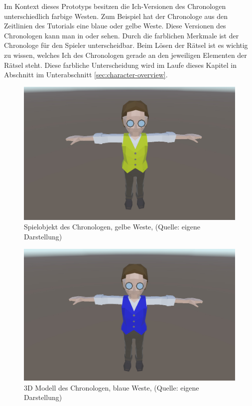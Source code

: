 Im Kontext dieses Prototyps besitzen die Ich-Versionen des Chronologen unterschiedlich farbige Westen. Zum Beispiel hat der Chronologe aus den Zeitlinien des Tutorials eine blaue oder gelbe Weste. Diese Versionen des Chronologen kann man in  oder  sehen. Durch die farblichen Merkmale ist der Chronologe für den Spieler unterscheidbar. Beim Lösen der Rätsel ist es wichtig zu wissen, welches Ich des Chronologen gerade an den jeweiligen Elementen der Rätsel steht. Diese farbliche Unterscheidung wird im Laufe dieses Kapitel in Abschnitt  im Unterabschnitt \ref{sec:character-overview}.

\begin{figure}[ht]
\centering
\includegraphics[width=0.8\linewidth]{content/pictures/Chronologe_y.jpg}
\caption{Spielobjekt des Chronologen, gelbe Weste, (Quelle: eigene Darstellung)}
\label{fig:chronologe_y}
\end{figure}

\begin{figure}[ht]
\centering
\includegraphics[width=0.8\linewidth]{content/pictures/Chronologe_b.jpg}
\caption{3D Modell des Chronologen, blaue Weste, (Quelle: eigene Darstellung)}
\label{fig:chronologe_b}
\end{figure}

